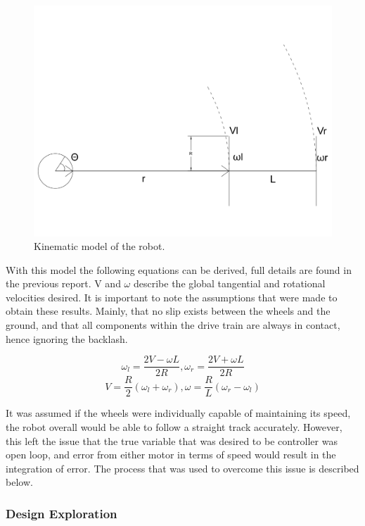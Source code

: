 \documentclass[ece]{uw-wkrpt}
\begin{document}
\begin{figure}
    \centering
    \includegraphics[width=5.5in]{res/diagram}
    \caption[Kinematic model of the robot]
          {Kinematic model of the robot.}
    \label{fig:kinematicModel}
\end{figure}

With this model the following equations can be derived, full details are found in the previous report. V and $\omega$ describe the global tangential and rotational velocities desired. It is important to note the assumptions that were made to obtain these results. Mainly, that no slip exists between the wheels and the ground, and that all components within the drive train are always in contact, hence ignoring the backlash.

\[\omega_l = \frac{2V-\omega L}{2R},\omega_r = \frac{2V+\omega L}{2R}\]
\[V=\frac{R}{2}(\omega_l+\omega_r),  \omega=\frac{R}{L}(\omega_r-\omega_l)\]

It was assumed if the wheels were individually capable of maintaining its speed, the robot overall would be able to follow a straight track accurately. However, this left the issue that the true variable that was desired to be controller was open loop, and error from either motor in terms of speed would result in the integration of error. The process that was used to overcome this issue is described below.

\subsubsection{Design Exploration}
\end{document}
